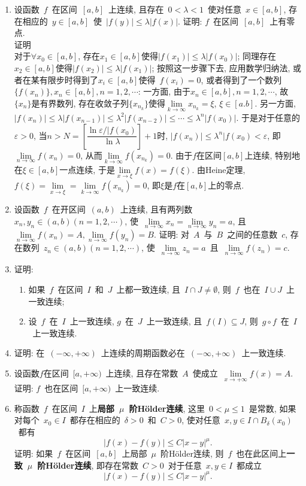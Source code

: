 \documentclass[UTF8,a4paper,20pt]{article}
\begin{document}
\begin{enumerate}[1.]
\item 设函数~$f$~在区间~$[a,b]$~上连续, 且存在~$0<\lambda<1$~使对任意~$x\in[a,b]$, 存在相应的~$y\in[a,b]$~使~$|f(y)|\leqslant\lambda|f(x)|$. 证明: $f$~在区间~$[a,b]$~上有零点.\\
{\heiti 证明}\\
对于$\forall x_0\in[a,b]$, 存在$x_1\in[a,b]$使得$|f(x_1)|\leqslant\lambda|f(x_0)|$; 同理存在$x_2\in[a,b]$使得$|f(x_2)|\leqslant\lambda|f(x_1)|$; 按照这一步骤下去, 应用数学归纳法, 或者在某有限步时得到了$x_i\in[a,b]$使得~$f(x_i)=0$, 或者得到了一个数列$\{f(x_n)\}, x_n\in[a,b], n=1,2,\cdots$: 一方面, 由于$x_n\in[a,b], n=1,2,\cdots$, 故$\{x_n\}$是有界数列, 存在收敛子列$\{x_{n_k}\}$使得$\lim\limits_{k\to\infty}x_{n_k}=\xi$, $\xi\in[a.b]$. 另一方面, $|f(x_n)|\leqslant \lambda|f(x_{n-1})|\leqslant\lambda^2|f(x_{n-2})|\leqslant\cdots\leqslant \lambda^n |f(x_0)|$. 于是对于任意的$\varepsilon>0$, 当$n>N=\left[\dfrac{\ln{\varepsilon/|f(x_0)}}{\ln{\lambda}}\right]+1$时, $|f(x_n)|\leqslant\lambda^n|f(x_0)<\varepsilon$, 即$\lim\limits_{n\to\infty}f(x_n)=0$, 从而$\lim\limits_{k\to\infty} f(x_{n_k})=0$. 由于$f$在区间$[a,b]$上连续, 特别地在$\xi\in[a,b]$一点连续, 于是$\lim\limits_{x\to\xi}f(x)=f(\xi)$. 由Heine定理, $f(\xi)=\lim\limits_{x\to\xi}=\lim\limits_{k\to\infty}f(x_{n_k})=0$, 即$\xi$是$f$在$[a,b]$上的零点.

\item 设函数~$f$~在开区间~$(a,b)$~上连续, 且有两列数$x_n, y_n\in(a,b) (n=1, 2, \cdots)$, 使~$\lim\limits_{n\to\infty}x_n=\lim\limits_{n\to\infty}y_n=a$, 且~$\lim\limits_{n\to\infty}f(x_n)=A, \lim\limits_{n\to\infty}f(y_n)=B$. 证明: 对~$A$~与~$B$~之间的任意数~$c$, 存在数列~$z_n\in(a,b)(n=1,2,\cdots)$, 使~$\lim\limits_{n\to\infty}z_n=a$~且~$\lim\limits_{n\to\infty}f(z_n)=c$.

\item 证明: 
	\begin{enumerate}[(1)]
	\item 如果~$f$~在区间~$I$~和~$J$~上都一致连续, 且~$I\cap J\neq\emptyset$, 则~$f$~也在~$I\cup J$~上一致连续;
	\item 设~$f$~在~$I$~上一致连续, $g$~在~$J$~上一致连续, 且~$f(I)\subseteq J$, 则~$g\circ f$~在~$I$~上一致连续.
	\end{enumerate}

\item 证明: 在~$(-\infty,+\infty)$~上连续的周期函数必在~$(-\infty,+\infty)$~上一致连续.

\item 设函数$f$在区间~$[a,+\infty)$~上连续, 且存在常数~$A$~使成立~$\lim\limits_{x\to+\infty}f(x)=A$. 证明: $f$~也在区间~$[a,+\infty)$~上一致连续.

\item 称函数~$f$~在区间~$I$~上{\bf 局部~$\mu$~阶H\"older连续}, 这里~$0<\mu\leqslant1$~是常数, 如果对每个~$x_0\in I$~都存在相应的~$\delta>0$~和~$C>0$, 使对任意~$x,y\in I\cap B_{\delta}(x_0)$~都有
\[ |f(x)-f(y)|\leqslant C|x-y|^{\mu}.\]
证明: 如果~$f$~在区间~$[a,b]$~上局部~$\mu$~阶H\"older连续, 则~$f$~也在此区间上{\bf 一致~$\mu$~阶H\"older连续}, 即存在常数~$C>0$~对于任意~$x,y\in I$~都成立
\[ |f(x)-f(y)|\leqslant C|x-y|^{\mu}.\]
\end{enumerate}
\end{document}
